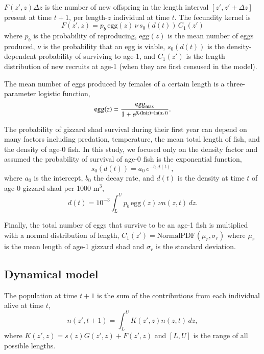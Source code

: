 \documentclass[preprint,review,12pt,authoryear]{elsarticle}
\def\ds{\displaystyle}
\begin{document}
$F(z',z)\Delta z$ is the number of new offspring in the length interval $[z', z' + \Delta z]$ present at time $t+1$, per length-$z$ individual at time $t$.
The fecundity kernel is
\begin{equation}\label{eq:fecundity}
F(z', z) = p_b \, \mbox{egg}(z) \, \nu \, s_0(d(t)) \, C_1(z')
\end{equation}
where $p_b$ is the probability of reproducing, $\mbox{egg}(z)$ is the mean number of eggs produced, $\nu$ is the probability that an egg is viable, $s_0(d(t))$ is the density-dependent probability of surviving to age-1, and $C_1 (z')$ is the length distribution of new recruits at age-1 (when they are first censused in the model).

The mean number of eggs produced by females of a certain length is a three-parameter logistic function,
\begin{equation}\label{eq:egg}
\mbox{egg}(z) = \frac{\mbox{egg}_{\rm max}}{1+e^{\beta_e(\ln(z)-\ln(\alpha_e))}}.
\end{equation}

The probability of gizzard shad survival during their first year can depend on many factors \citep{michaletz2010overwinter} including predation, temperature, the mean total length of fish, and the density of age-0 fish.  
In this study, we focused only on the density factor and assumed the probability of survival of age-0 fish is the exponential function,
\begin{equation}\label{eq:s0}
s_0(d(t)) = a_0 \, e^{-b_0 d(t)},
\end{equation}
where $a_0$ is the intercept, $b_0$ the decay rate, and $d(t)$ is the density at time $t$ of age-0 gizzard shad per 1000 m$^3$, 
\[ d(t) = 10^{-3} \int_L^U p_b \, \mbox{egg}(z) \, \nu n(z,t) \, dz. \]  

Finally, the total number of eggs that survive to be an age-1 fish is multiplied with a normal distribution of length,
$ \ds C_1 (z') =  \mathrm{Normal PDF} (\mu_r, \sigma_r)$ where $\mu_r$ is the mean length of age-1 gizzard shad and $\sigma_r$ is the standard deviation. 

\subsection{Dynamical model} 
The population at time $t+1$ is the sum of the contributions from each individual alive at time $t$,
\begin{equation}\label{eq:IPM}
n(z',t+1) = \int_L^U K(z',z)n(z,t) \,dz,
\end{equation}  
where $K(z',z) = s(z) G(z',z) + F(z',z)$ and $[L,U]$ is the range of all possible lengths.
\end{document}

